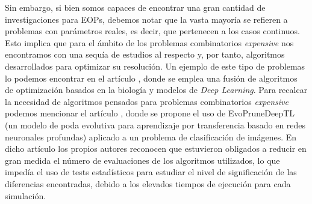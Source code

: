 
Sin embargo, si bien somos capaces de encontrar una gran cantidad de investigaciones para EOPs, debemos notar que la vasta mayoría se refieren a problemas con parámetros reales, es decir, que pertenecen a los casos continuos. 
Esto implica que para el ámbito de los problemas combinatorios \textit{expensive} nos encontramos con una sequía de estudios al respecto y, por tanto, algoritmos desarrollados para optimizar su resolución. 
Un ejemplo de este tipo de problemas lo podemos encontrar en el artículo \parencite{martinezLightsShadowsEvolutionary2021b}, donde se emplea una fusión de algoritmos de optimización basados en la biología y modelos de \textit{Deep Learning}. 
Para recalcar la necesidad de algoritmos pensados para problemas combinatorios \textit{expensive} podemos mencionar el artículo \parencite{poyatosEvoPruneDeepTLEvolutionaryPruning2023a}, donde se propone el uso de EvoPruneDeepTL (un modelo de poda evolutiva para aprendizaje por transferencia basado en redes neuronales profundas) aplicado a un problema de clasificación de imágenes. 
En dicho artículo los propios autores reconocen que estuvieron obligados a reducir en gran medida el número de evaluaciones de los algoritmos utilizados, lo que impedía el uso de tests estadísticos para estudiar el nivel de significación de las diferencias encontradas, debido a los elevados tiempos de ejecución para cada simulación. 

